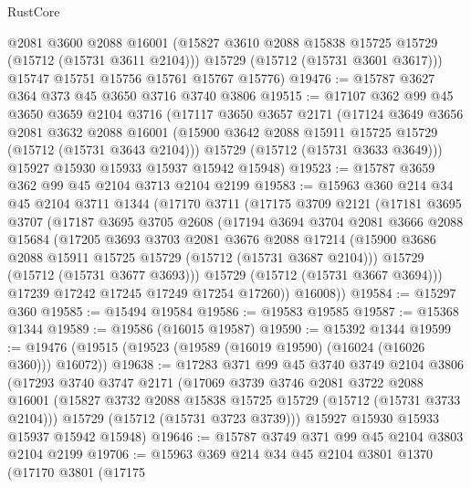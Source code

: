 \begin{lexlean}{RustCore}
\begin{coremodule}
        @2081
        @3600
        @2088
        @16001
        (@15827 @3610 @2088 @15838 @15725 @15729 (@15712 (@15731 @3611 @2104)))
        @15729
        (@15712 (@15731 @3601 @3617)))
      @15747
      @15751
      @15756
      @15761
      @15767
      @15776)
@19476 := @15787 @3627 @364 @373 @45 @3650 @3716 @3740 @3806
@19515 := @17107
    @362
    @99
    @45
    @3650
    @3659
    @2104
    @3716
    (@17117
      @3650
      @3657
      @2171
      (@17124
        @3649
        @3656
        @2081
        @3632
        @2088
        @16001
        (@15900 @3642 @2088 @15911 @15725 @15729 (@15712 (@15731 @3643 @2104)))
        @15729
        (@15712 (@15731 @3633 @3649)))
      @15927
      @15930
      @15933
      @15937
      @15942
      @15948)
@19523 := @15787 @3659 @362 @99 @45 @2104 @3713 @2104 @2199
@19583 := @15963
    @360
    @214
    @34
    @45
    @2104
    @3711
    @1344
    (@17170
      @3711
      (@17175
        @3709
        @2121
        (@17181
          @3695
          @3707
          (@17187
            @3695
            @3705
            @2608
            (@17194
              @3694
              @3704
              @2081
              @3666
              @2088
              @15684
              (@17205
                @3693
                @3703
                @2081
                @3676
                @2088
                @17214
                (@15900 @3686 @2088 @15911 @15725 @15729 (@15712 (@15731 @3687 @2104)))
                @15729
                (@15712 (@15731 @3677 @3693)))
              @15729
              (@15712 (@15731 @3667 @3694)))
            @17239
            @17242
            @17245
            @17249
            @17254
            @17260))
        @16008))
@19584 := @15297 @360
@19585 := @15494 @19584
@19586 := @19583 @19585
@19587 := @15368 @1344
@19589 := @19586 (@16015 @19587)
@19590 := @15392 @1344
@19599 := @19476 (@19515 (@19523 (@19589 (@16019 @19590) (@16024 (@16026 @360))) @16072))
@19638 := @17283
    @371
    @99
    @45
    @3740
    @3749
    @2104
    @3806
    (@17293
      @3740
      @3747
      @2171
      (@17069
        @3739
        @3746
        @2081
        @3722
        @2088
        @16001
        (@15827 @3732 @2088 @15838 @15725 @15729 (@15712 (@15731 @3733 @2104)))
        @15729
        (@15712 (@15731 @3723 @3739)))
      @15927
      @15930
      @15933
      @15937
      @15942
      @15948)
@19646 := @15787 @3749 @371 @99 @45 @2104 @3803 @2104 @2199
@19706 := @15963
    @369
    @214
    @34
    @45
    @2104
    @3801
    @1370
    (@17170
      @3801
      (@17175

\end{coremodule}
\end{lexlean}
